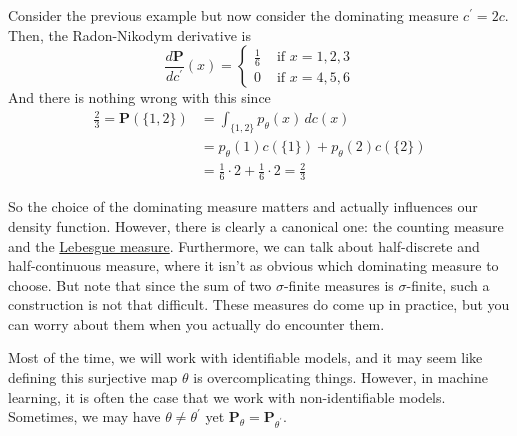   \begin{example}
    \label{ex:rescaling-the-dominating-measure}
    Consider the previous example but now consider the dominating measure $c^\prime = 2 c$. Then, the Radon-Nikodym derivative is 
    \begin{equation}
      \frac{d \mathbf{P}}{d c^\prime} (x) = \begin{cases} 
        \frac{1}{6} & \text{ if } x = 1, 2, 3 \\ 
        0 & \text{ if } x = 4, 5, 6
      \end{cases} 
    \end{equation}
    And there is nothing wrong with this since 
    \begin{align}
      \frac{2}{3} = \mathbf{P}(\{1, 2\}) & = \int_{\{1, 2\}} p_\theta (x) \, d c(x) \\ 
                                         & = p_\theta (1) c(\{1\}) + p_\theta (2) c(\{2\}) \\ 
                                         & = \frac{1}{6} \cdot 2 + \frac{1}{6} \cdot 2 = \frac{2}{3}
    \end{align}
  \end{example}

  So the choice of the dominating measure matters and actually influences our density function. However, there is clearly a canonical one: the counting measure and the \hyperref[mt-def:lebesgue-measure]{Lebesgue measure}. Furthermore, we can talk about half-discrete and half-continuous measure, where it isn't as obvious which dominating measure to choose. But note that since the sum of two $\sigma$-finite measures is $\sigma$-finite, such a construction is not that difficult. These measures do come up in practice, but you can worry about them when you actually do encounter them. 


  \begin{example}
    \label{ex:non-identifiable-models}
    Most of the time, we will work with identifiable models, and it may seem like defining this surjective map $\theta$ is overcomplicating things. However, in machine learning, it is often the case that we work with non-identifiable models. Sometimes, we may have $\theta \neq \theta^\prime$ yet $\mathbf{P}_{\theta} = \mathbf{P}_{\theta^\prime}$. 
  \end{example}


